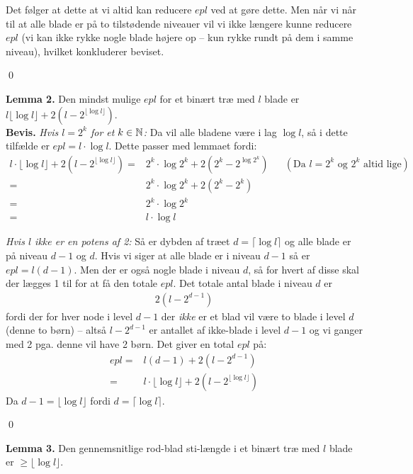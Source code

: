 Det følger at dette at vi altid kan reducere $epl$ ved at gøre dette. Men når vi når til at alle blade er på to tilstødende niveauer vil vi ikke længere kunne reducere $epl$ (vi kan ikke rykke nogle blade højere op -- kun rykke rundt på dem i samme niveau), hvilket konkluderer beviset. 
\begin{flushright}
	\qed
\end{flushright}

\textbf{Lemma 2.} Den mindst mulige $epl$ for et binært træ med $l$ blade er $l \lfloor \log l \rfloor + 2(l-2^{\lfloor \log l \rfloor})$. \\

\textbf{Bevis.} \textit{Hvis $l=2^k$ for et $k \in \mathbb{N}$:} Da vil alle bladene være i lag $\log l$, så i dette tilfælde er $epl=l \cdot \log l$. Dette passer med lemmaet fordi:
\begin{align*}
	l \cdot \lfloor \log l \rfloor + 2(l-2^{\lfloor \log l \rfloor}) =& 2^k \cdot \log 2^k + 2(2^k-2^{\log 2^k}) && (\text{Da } l=2^k \text{ og } 2^k \text{ altid lige}) \\
	=&2^k \cdot \log 2^k +2(2^k-2^k) \\
	=&2^k \cdot \log 2^k \\
	=& l \cdot \log l
\end{align*}

\textit{Hvis $l$ ikke er en potens af 2:} Så er dybden af træet $d=\lceil \log l \rceil$ og alle blade er på niveau $d-1$ og $d$. Hvis vi siger at alle blade er i niveau $d-1$ så er $epl=l(d-1)$. Men der er også nogle blade i niveau $d$, så for hvert af disse skal der lægges 1 til for at få den totale $epl$. Det totale antal blade i niveau $d$ er 
\begin{align*}
	2(l-2^{d-1})
\end{align*}
fordi der for hver node i level $d-1$ der \textit{ikke} er et blad vil være to blade i level $d$ (denne to børn) -- altså $l-2^{d-1}$ er antallet af ikke-blade i level $d-1$ og vi ganger med 2 pga. denne vil have 2 børn. Det giver en total $epl$ på:
\begin{align*}
	epl =& l(d-1) + 2(l-2^{d-1}) \\
	=& l \cdot \lfloor \log l \rfloor + 2(l-2^{\lfloor \log l \rfloor})
\end{align*}
Da $d-1=\lfloor \log l \rfloor$ fordi $d=\lceil \log l \rceil$. 
\begin{flushright}
	\qed
\end{flushright}

\textbf{Lemma 3.} Den gennemsnitlige rod-blad sti-længde i et binært træ med $l$ blade er $\ge \lfloor \log l \rfloor$. \\


